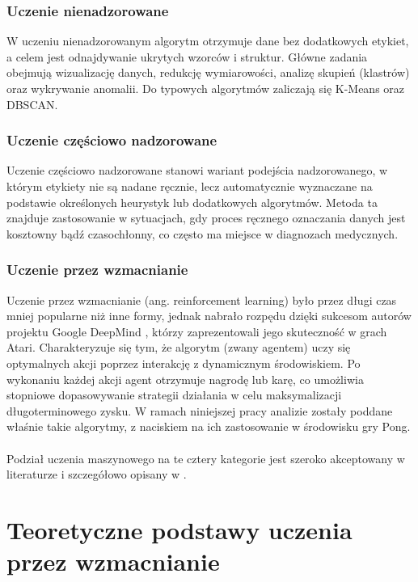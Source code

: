 \documentclass[a4paper, 12pt]{article}
\numberwithin{equation}{section}
\begin{document}
    \subsubsection{Uczenie nienadzorowane}
    W uczeniu nienadzorowanym algorytm otrzymuje dane bez dodatkowych etykiet, a celem jest odnajdywanie ukrytych wzorców i struktur. Główne zadania obejmują wizualizację danych, redukcję wymiarowości, analizę skupień (klastrów) oraz wykrywanie anomalii. Do typowych algorytmów zaliczają się K-Means oraz DBSCAN.

    \subsubsection{Uczenie częściowo nadzorowane}
    Uczenie częściowo nadzorowane stanowi wariant podejścia nadzorowanego, w którym etykiety nie są nadane ręcznie, lecz automatycznie wyznaczane na podstawie określonych heurystyk lub dodatkowych algorytmów. Metoda ta znajduje zastosowanie w sytuacjach, gdy proces ręcznego oznaczania danych jest kosztowny bądź czasochłonny, co często ma miejsce w diagnozach medycznych.

    \subsubsection{Uczenie przez wzmacnianie}
    Uczenie przez wzmacnianie (ang. reinforcement learning) było przez długi czas mniej popularne niż inne formy, jednak nabrało rozpędu dzięki sukcesom autorów projektu Google DeepMind \cite{mnih2015nature}, którzy zaprezentowali jego skuteczność w grach Atari. Charakteryzuje się tym, że algorytm (zwany agentem) uczy się optymalnych akcji poprzez interakcję z dynamicznym środowiskiem. Po wykonaniu każdej akcji agent otrzymuje nagrodę lub karę, co umożliwia stopniowe dopasowywanie strategii działania w celu maksymalizacji długoterminowego zysku. W ramach niniejszej pracy analizie zostały poddane właśnie takie algorytmy, z naciskiem na ich zastosowanie w środowisku gry Pong.
    \\ \\ 
    Podział uczenia maszynowego na te cztery kategorie jest szeroko akceptowany w literaturze i szczegółowo opisany w \cite{sutton2018rl}.

    
    \section{Teoretyczne podstawy uczenia przez wzmacnianie}
\end{document}

